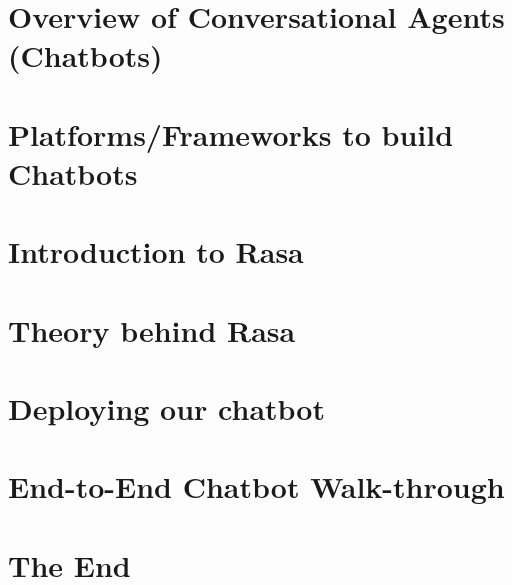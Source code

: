 \section[Overview]{Overview of Conversational Agents (Chatbots)}


\section[Platforms]{Platforms/Frameworks to build Chatbots}



\section[Intro]{Introduction to Rasa}



\section[Theory]{Theory behind Rasa}



% 
% 

% 
% 

\section[Deploy]{Deploying our chatbot}


\section[Zomato]{End-to-End Chatbot Walk-through}


\section[End]{The End}

